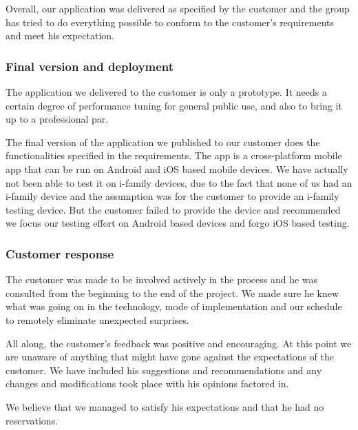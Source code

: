     Overall, our application was delivered as specified by the customer and the group has tried to do everything possible to conform to the customer's requirements and meet his expectation.
	\subsubsection{Final version and deployment}
The application we delivered to the customer is only a prototype. It needs a certain degree of performance tuning for general public use, and also to bring it up to a professional par.

The final version of the application we published to our customer does the functionalities specified in the requirements. The app is a cross-platform mobile app that can be run on Android and iOS based mobile devices. We have actually not been able to test it on i-family devices, due to the fact that none of us had an i-family device and the assumption was for the customer to provide an i-family testing device. But the customer failed to provide the device and recommended we focus our testing effort on Android based devices and forgo iOS based testing.



	\subsubsection{Customer response}
The customer was made to be involved actively in the process and he was consulted from the beginning to the end of the project. We made sure he knew what was going on in the technology, mode of implementation and our schedule to remotely eliminate unexpected surprises.

All along, the customer's feedback was positive and encouraging. At this point we are unaware of anything that might have gone against the expectations of the customer.
We have included his suggestions and recommendations and any changes and modifications took place with his opinions factored in.

We believe that we managed to satisfy his expectations and that he had no reservations.
	


